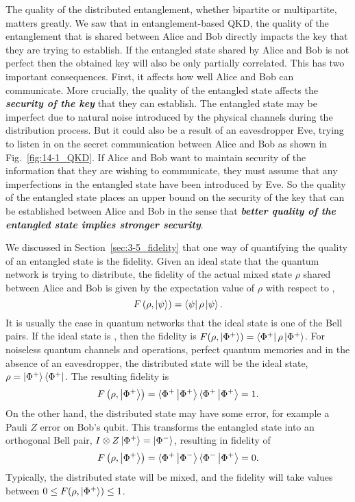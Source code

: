 The quality of the distributed entanglement, whether bipartite or multipartite, matters greatly.
We saw that in entanglement-based QKD, the quality of the entanglement that is shared between Alice and Bob directly impacts the key that they are trying to establish.
If the entangled state shared by Alice and Bob is not perfect then the obtained key will also be only partially correlated.
This has two important consequences.
First, it affects how well Alice and Bob can communicate.
More crucially, the quality of the entangled state affects the \emph{\textbf{security of the key}} that they can establish.
The entangled state may be imperfect due to natural noise introduced by the physical channels during the distribution process.
But it could also be a result of an eavesdropper Eve, trying to listen in on the secret communication between Alice and Bob as shown in Fig.~\ref{fig:14-1_QKD}.
If Alice and Bob want to maintain security of the information that they are wishing to communicate, they must assume that any imperfections in the entangled state have been introduced by Eve.
So the quality of the entangled state places an upper bound on the security of the key that can be established between Alice and Bob in the sense that \emph{\textbf{better quality of the entangled state implies stronger security}}.

We discussed in Section~\ref{sec:3-5_fidelity} that one way of quantifying the quality of an entangled state is the fidelity.
Given an ideal state \ket{\psi} that the quantum network is trying to distribute, the fidelity of the actual mixed state $\rho$ shared between Alice and Bob is given by the expectation value of $\rho$ with respect to \ket{\psi},
\begin{equation}
    F \left( \rho, \left| \psi \right\rangle \right) = \left\langle \psi \right|\rho\left| \psi \right\rangle.
\end{equation}
It is usually the case in quantum networks that the ideal state is one of the Bell pairs.
If the ideal state is \ket{\Phi^+}, then the fidelity is $F (\rho, \left| \Phi^+ \right\rangle) = \left\langle \Phi^+ \right|\rho\left| \Phi^+ \right\rangle$.
For noiseless quantum channels and operations, perfect quantum memories and in the absence of an eavesdropper, the distributed state will be the ideal state, $\rho = \left| \Phi^+ \right\rangle\left\langle \Phi^+ \right|$.
The resulting fidelity is
\begin{equation}
    F \left( \rho, \left| \Phi^+ \right\rangle \right) = \langle\Phi^+\left| \Phi^+ \right\rangle \langle\Phi^+\left| \Phi^+ \right\rangle = 1.
\end{equation}
On the other hand, the distributed state may have some error, for example a Pauli $Z$ error on Bob's qubit.
This transforms the entangled state into an orthogonal Bell pair, $I \otimes Z \left| \Phi^+ \right\rangle = \left| \Phi^- \right\rangle$, resulting in fidelity of
\begin{equation}
    F \left( \rho, \left| \Phi^+ \right\rangle \right) = \langle\Phi^+\left| \Phi^- \right\rangle \langle\Phi^-\left| \Phi^+ \right\rangle = 0.
    \label{eq:14-1_fidelity_0}
\end{equation}
Typically, the distributed state will be mixed, and the fidelity will take values between $ 0 \leq F(\rho, \left| \Phi^+ \right\rangle) \leq 1$.

